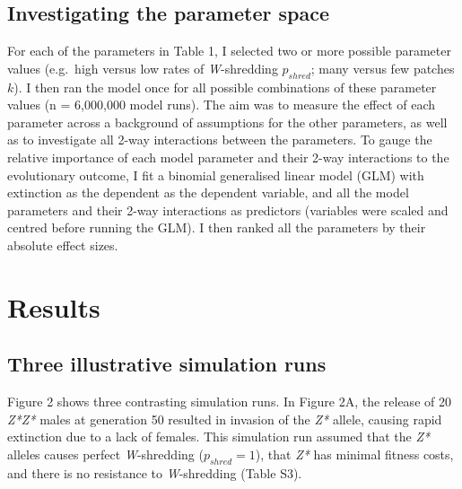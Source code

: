 \documentclass[]{rsos}%
\begin{document}
\hypertarget{investigating-the-parameter-space}{%
\subsection{Investigating the parameter
space}\label{investigating-the-parameter-space}}

For each of the parameters in Table 1, I selected two or more possible
parameter values (e.g.~high versus low rates of \emph{W}-shredding
\(p_{shred}\); many versus few patches \(k\)). I then ran the model once
for all possible combinations of these parameter values (n = 6,000,000
model runs). The aim was to measure the effect of each parameter across
a background of assumptions for the other parameters, as well as to
investigate all 2-way interactions between the parameters. To gauge the
relative importance of each model parameter and their 2-way interactions
to the evolutionary outcome, I fit a binomial generalised linear model
(GLM) with extinction as the dependent as the dependent variable, and
all the model parameters and their 2-way interactions as predictors
(variables were scaled and centred before running the GLM). I then
ranked all the parameters by their absolute effect sizes.

\hypertarget{results}{%
\section{Results}\label{results}}

\hypertarget{three-illustrative-simulation-runs}{%
\subsection{Three illustrative simulation
runs}\label{three-illustrative-simulation-runs}}

Figure 2 shows three contrasting simulation runs. In Figure 2A, the
release of 20 \emph{Z*Z*} males at generation 50 resulted in invasion of
the \emph{Z*} allele, causing rapid extinction due to a lack of females.
This simulation run assumed that the \emph{Z*} alleles causes perfect
\emph{W}-shredding (\(p_{shred} = 1\)), that \emph{Z*} has minimal
fitness costs, and there is no resistance to \emph{W}-shredding (Table
S3).
\end{document}
